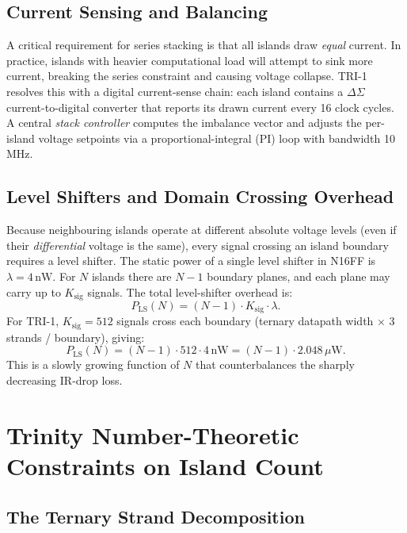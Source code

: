 \subsection{Current Sensing and Balancing}

A critical requirement for series stacking is that all islands draw
\emph{equal} current.  In practice, islands with heavier computational
load will attempt to sink more current, breaking the series constraint
and causing voltage collapse.  TRI-1 resolves this with a digital
current-sense chain: each island contains a $\Delta\Sigma$ current-to-digital
converter that reports its drawn current every 16 clock cycles.  A
central \emph{stack controller} computes the imbalance vector and adjusts
the per-island voltage setpoints via a proportional-integral (PI) loop
with bandwidth 10\,MHz.

\subsection{Level Shifters and Domain Crossing Overhead}

Because neighbouring islands operate at different absolute voltage
levels (even if their \emph{differential} voltage is the same), every
signal crossing an island boundary requires a level shifter.  The static
power of a single level shifter in N16FF is $\lambda = 4\,\mathrm{nW}$.
For $N$ islands there are $N-1$ boundary planes, and each plane may
carry up to $K_{\mathrm{sig}}$ signals.  The total level-shifter overhead is:
\[
  P_{\mathrm{LS}}(N) = (N-1) \cdot K_{\mathrm{sig}} \cdot \lambda.
\]
For TRI-1, $K_{\mathrm{sig}} = 512$ signals cross each boundary (ternary
datapath width $\times$ 3 strands / boundary), giving:
\[
  P_{\mathrm{LS}}(N) = (N-1) \cdot 512 \cdot 4\,\mathrm{nW} = (N-1) \cdot 2.048\,\mu\mathrm{W}.
\]
This is a slowly growing function of $N$ that counterbalances the
sharply decreasing IR-drop loss.

\section{Trinity Number-Theoretic Constraints on Island Count}
\label{sec:trinity_nt}

\subsection{The Ternary Strand Decomposition}

